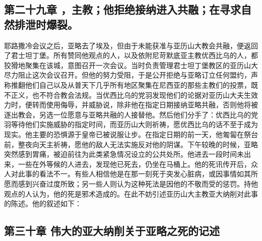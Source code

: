 
\subsection{第二十九章 ，主教；他拒绝接纳进入共融；在寻求自然排泄时爆裂。}

耶路撒冷会议之后，亚略去了埃及，但由于未能获准与亚历山大教会共融，便返回了君士坦丁堡。所有赞同他观点的人，以及依附尼苛默底亚主教优西比乌的人，都狡猾地聚集在该城，意图召开一次会议。当时负责管理君士坦丁堡教区的亚历山大尽力阻止这次会议召开。但他的努力受阻，于是公开拒绝与亚略订立任何盟约，声称推翻他们自己以及从普天下几乎所有地区聚集在尼西亚的那些主教们的投票，既不正义，也不符合教会法规。当优西比乌的党羽发现他们的论据对亚历山大夫生效力时，便转而使用侮辱，并威胁说，除非他在指定日期接纳亚略共融，否则他将被逐出教会，另选一位愿意与亚略共融的人接替他。然后他们分手了：优西比乌的党羽等待他们实施威胁的指定时间，而亚历山大则祈祷，愿优西比乌的话不至于成为现实。他主要的恐惧源于皇帝已被说服让步。在指定日期的前一天，他匍匐在祭台前，整夜向天主祈祷，愿他的敌人无法实施反对他的阴谋。下午较晚的时候，亚略突然感到胃痛，被迫前往为此类紧急情况设立的公共处所。他进去一段时间未出来，一些在外等候的人进去，发现他已死去，仍坐在马桶上。他的死讯传开后，众人对此事的看法不一。有些人相信他是在那一刻死于突发心脏病，或因事情如其所愿而感到兴奋过度所致；另一些人则认为这种死法是因他的不敬而受的惩罚。持他观点的人认为，他的死是邪术造成的。在此不妨引述亚历山大主教亚大纳削对此事的陈述。他的叙述如下：\par


\subsection{第三十章 伟大的亚大纳削关于亚略之死的记述}

